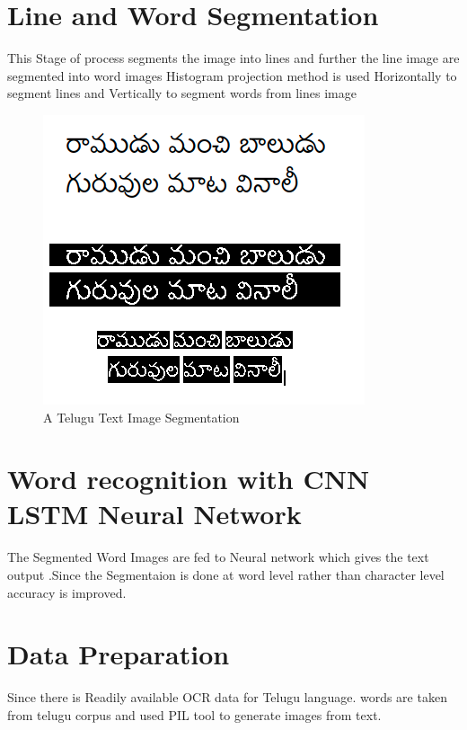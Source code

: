 \section{Line and Word Segmentation}
This Stage of process segments the image into lines and further the line image are segmented into word images
Histogram projection method is used Horizontally to segment lines and Vertically to segment words from lines image
\begin{figure}[h]
\centering
\includegraphics{Figures/image_segmentaion.png}
\caption{A Telugu Text Image Segmentation}
\end{figure}

\section{Word recognition with CNN LSTM Neural Network}
The Segmented Word Images are fed to Neural network which gives the text output .Since the Segmentaion is done at word level rather than character level accuracy is improved.

\section{Data Preparation}
Since there is Readily available OCR  data for Telugu language. words are taken from telugu corpus and used PIL tool to generate images from text.



